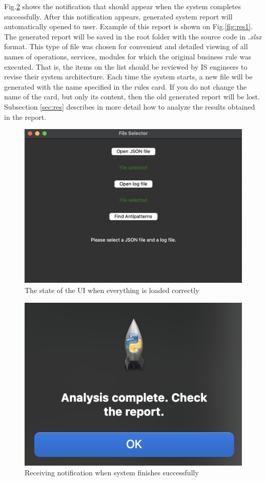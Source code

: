 \documentclass[12pt, times]{article}
\begin{document}
	  Fig.\ref{fig:ui3} shows the notification that should appear when the system completes successfully. After this notification appears, generated system report will automatically opened to user. Example of this report is shown on Fig.\ref{fig:res1}. The generated report will be saved in the root folder with the source code in \textit{.xlsx} format. This type of file was chosen for convenient and detailed viewing of all names of operations, services, modules for which the original business rule was executed. That is, the items on the list should be reviewed by IS engineers to revise their system architecture. Each time the system starts, a new file will be generated with the name specified in the rules card. If you do not change the name of the card, but only its content, then the old generated report will be lost. Subsection \ref{sec:res} describes in more detail how to analyze the results obtained in the report.
	  
	    \begin{figure}[h]
	  	\centering
	  	\includegraphics[scale=0.6]{ui2}
	  	\caption{The state of the UI when everything is loaded correctly}
	  	\label{fig:ui2}
	  \end{figure}

	\begin{figure}[h]
		\centering
		\includegraphics[scale=0.6]{ui3}
		\caption{Receiving notification when system finishes successfully}
		\label{fig:ui3}
	\end{figure}
\end{document}
